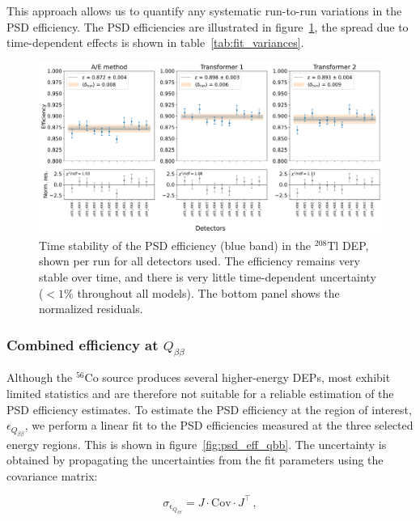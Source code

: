 This approach allows us to quantify any systematic run-to-run variations in the PSD efficiency. The PSD efficiencies are illustrated in figure~\ref{fig:psd_timevar}, the spread due to time-dependent effects is shown in table~\ref{tab:fit_variances}. 


\begin{figure}
    \centering
    \includegraphics[width=\linewidth]{figures/05_PSD/PSD_eff_timevar_new.png}
    \caption{Time stability of the PSD efficiency (blue band) in the $^{208}$Tl DEP, shown per run for all detectors used. The efficiency remains very stable over time, and there is very little time-dependent uncertainty ($< 1\%$ throughout all models). The bottom panel shows the normalized residuals. }
\label{fig:psd_timevar}
\end{figure}



\subsubsection{Combined efficiency at \texorpdfstring{$Q_{\beta \beta}$}{}}

Although the $^{56}$Co source produces several higher-energy DEPs, most exhibit limited statistics and are therefore not suitable for a reliable estimation of the PSD efficiency estimates. 
To estimate the PSD efficiency at the region of interest, $\epsilon_{Q_{\beta \beta}}$, we perform a linear fit to the PSD efficiencies measured at the three selected energy regions. This is shown in figure~\ref{fig:psd_eff_qbb}. The uncertainty is obtained by propagating the uncertainties from the fit parameters using the covariance matrix:

\begin{equation}
\label{eq:linear_with_unc}
	\sigma_{\epsilon_{Q_{\beta \beta}}} = J \cdot \mathrm{Cov} \cdot J^\intercal \, ,
\end{equation}

